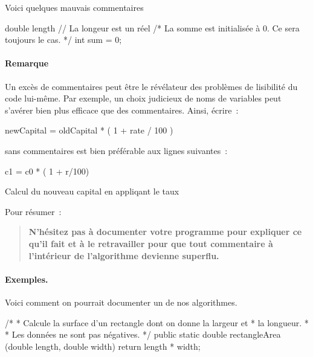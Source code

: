 			Voici quelques mauvais 	commentaires
			

				\begin{java}
double length 		// La longeur est un réel
/* La somme est initialisée à 0. 
   Ce sera toujours le cas. */
int sum = 0;
				\end{java}
		
				\paragraph{Remarque}

				Un excès de commentaires peut être le révélateur des problèmes
				de lisibilité du code lui-même.  Par exemple, un choix judicieux
				de noms de variables peut s’avérer bien plus efficace que des
				commentaires.  Ainsi, écrire~:

				\begin{langagenaturel}
					newCapital = oldCapital * ( 1 + rate / 100 )
				\end{langagenaturel}

	
				sans commentaires est bien préférable aux lignes suivantes~:
	
				\begin{wrong}
					\begin{langagenaturel}
						c1 = c0 * ( 1 + r/100)
						
						Calcul du nouveau capital en appliqant le taux
					\end{langagenaturel}
				\end{wrong}

			\bigskip
			Pour résumer~:
			\begin{quote}
				\bfseries
				N’hésitez pas à documenter votre programme 
				pour expliquer ce qu’il fait
				et à le retravailler pour que tout
				commentaire à l’intérieur de l’algorithme
				devienne superflu.
			\end{quote}

			\paragraph{Exemples.}
			Voici comment on pourrait documenter un de nos algorithmes.

			\begin{java}
/* 
 * Calcule la surface d'un rectangle dont on donne la largeur et 
 * la longueur.
 * 
 * Les données ne sont pas négatives.
 */
public static double rectangleArea (double length, double width){
	return length * width;
}
			\end{java}
			
